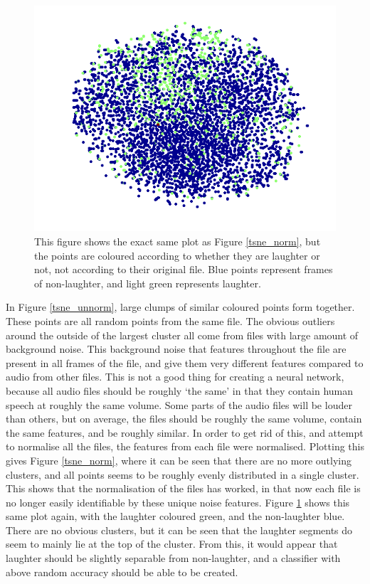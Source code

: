 \documentclass[a4paper,11pt,notitlepage]{article}
\begin{document}
\begin{figure}[H]
	\centering
	\vspace{0.5cm}
	\includegraphics[scale = 0.75]{figs/tsne_normalised_with_laughter.png}
	\caption{This figure shows the exact same plot as Figure \ref{tsne_norm}, but the points are coloured according to whether they are laughter or not, not according to their original file. Blue points represent frames of non-laughter, and light green represents laughter.}
	\label{tsne_norm_laughter}
\end{figure}
\clearpage

\noindent
In Figure \ref{tsne_unnorm}, large clumps of similar coloured points form together. These points are all random points from the same file. The obvious outliers around the outside of the largest cluster all come from files with large amount of background noise. This background noise that features throughout the file are present in all frames of the file, and give them very different features compared to audio from other files. This is not a good thing for creating a neural network, because all audio files should be roughly `the same' in that they contain human speech at roughly the same volume. Some parts of the audio files will be louder than others, but on average, the files should be roughly the same volume, contain the same features, and be roughly similar. In order to get rid of this, and attempt to normalise all the files, the features from each file were normalised. Plotting this gives Figure \ref{tsne_norm}, where it can be seen that there are no more outlying clusters, and all points seems to be roughly evenly distributed in a single cluster. This shows that the normalisation of the files has worked, in that now each file is no longer easily identifiable by these unique noise features. Figure \ref{tsne_norm_laughter} shows this same plot again, with the laughter coloured green, and the non-laughter blue. There are no obvious clusters, but it can be seen that the laughter segments do seem to mainly lie at the top of the cluster. From this, it would appear that laughter should be slightly separable from non-laughter, and a classifier with above random accuracy should be able to be created.
\end{document}
